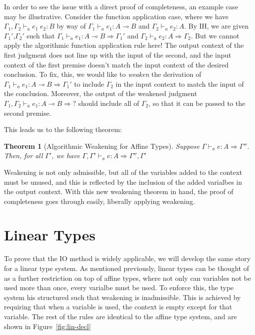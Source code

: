 \documentclass{article}
\newtheorem{theorem}{Theorem}
\theoremstyle{definition}
\newcommand{\loli}{\multimap}
\newcommand{\gens}{\Rightarrow}
\begin{document}
In order to see the issue with a direct proof of completeness, an example case may be illustrative. Consider the function application case, where we have
$\Gamma_1,\Gamma_2 \vdash_a e_1 \; e_2 : B$ by way of $\Gamma_1 \vdash_a e_1 : A \loli B$ and $\Gamma_2 \vdash_a e_2 : A$. By IH, we are given $\Gamma_1'$,$\Gamma_2'$ such that
$\Gamma_1 \vdash_a e_1 : A \loli B \gens \Gamma_1'$ and $\Gamma_2 \vdash_a e_2 : A \gens \Gamma_2$. But we cannot apply the algorithmic function application rule here! The output context of the first judgment does not line up with the input of the second, and the input context of the first premise doesn't match the input context of the desired conclusion. To fix, this, we would like to \textit{weaken} the derivation of $\Gamma_1 \vdash_a e_1 : A \loli B \gens \Gamma_1'$ to include $\Gamma_2$ in the input context to match the input of the conclusion. Moreover, the output of the weakened judgment $\Gamma_1,\Gamma_2 \vdash_a e_1 : A \loli B \gens ?$ should include all of $\Gamma_2$, so that it can be passed to the second premise.

This leads us to the following theorem:
\begin{theorem}[Algorithmic Weakening for Affine Types]
Suppose $\Gamma \vdash_a e : A \gens \Gamma''$. Then, for all $\Gamma'$, we have $\Gamma,\Gamma' \vdash_a e : A \gens \Gamma'', \Gamma'$
\end{theorem}

Weakening is not only admissible, but all of the variables added to the context must be unused, and this is reflected by the inclusion of the added varialbes in the output context. With this new weakening theorem in hand, the proof of completeness goes through easily, liberally applying weakening.

\section{Linear Types}
To prove that the IO method is widely applicable, we will develop the same story for a linear type system. As mentioned previously, linear types can be thought of as a further restriction on top of affine types, where not only can variables not be used more than once, every varialbe must be used. To enforce this, the type system his structured such that weakening is inadmissible. This is achieved by requiring that when a variable is used, the context is empty except for that variable. The rest of the rules are identical to the affine type system, and are shown in Figure~\ref{fig:lin-decl}
\end{document}

